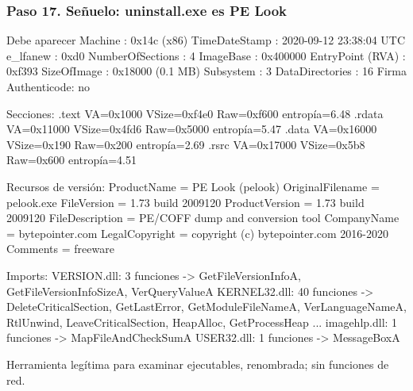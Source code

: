 \documentclass[11pt,a4paper]{article}
\begin{document}
\subsubsection*{Paso 17. Señuelo: uninstall.exe es PE Look}
\begin{salida}{Debe aparecer}
Machine          : 0x14c  (x86)
TimeDateStamp    : 2020-09-12 23:38:04 UTC
e_lfanew         : 0xd0
NumberOfSections : 4
ImageBase        : 0x400000
EntryPoint (RVA) : 0xf393
SizeOfImage      : 0x18000  (0.1 MB)
Subsystem        : 3
DataDirectories  : 16
Firma Authenticode: no

Secciones:
  .text    VA=0x1000    VSize=0xf4e0    Raw=0xf600   entropía=6.48
  .rdata   VA=0x11000   VSize=0x4fd6    Raw=0x5000   entropía=5.47
  .data    VA=0x16000   VSize=0x190     Raw=0x200    entropía=2.69
  .rsrc    VA=0x17000   VSize=0x5b8     Raw=0x600    entropía=4.51

Recursos de versión:
  ProductName        = PE Look (pelook)
  OriginalFilename   = pelook.exe
  FileVersion        = 1.73 build 2009120
  ProductVersion     = 1.73 build 2009120
  FileDescription    = PE/COFF dump and conversion tool
  CompanyName        = bytepointer.com
  LegalCopyright     = copyright (c) bytepointer.com 2016-2020
  Comments           = freeware

Imports:
  VERSION.dll: 3 funciones -> GetFileVersionInfoA, GetFileVersionInfoSizeA, VerQueryValueA
  KERNEL32.dll: 40 funciones -> DeleteCriticalSection, GetLastError, GetModuleFileNameA, VerLanguageNameA, RtlUnwind, LeaveCriticalSection, HeapAlloc, GetProcessHeap ...
  imagehlp.dll: 1 funciones -> MapFileAndCheckSumA
  USER32.dll: 1 funciones -> MessageBoxA
\end{salida}
\begin{nota}Herramienta legítima para examinar ejecutables, renombrada; sin funciones de red.\end{nota}
\end{document}
